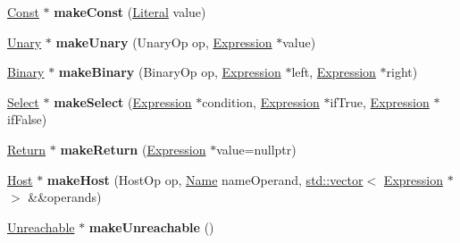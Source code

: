 \begin{DoxyCompactItemize}
\item 
\mbox{\label{classwasm_1_1_builder_a622973d92fa43fc978cd154b53f31558}} 
\mbox{\hyperlink{classwasm_1_1_const}{Const}} $\ast$ {\bfseries make\+Const} (\mbox{\hyperlink{classwasm_1_1_literal}{Literal}} value)
\item 
\mbox{\label{classwasm_1_1_builder_a750ec80e711cc4cf3f63f9b2875e8b5f}} 
\mbox{\hyperlink{classwasm_1_1_unary}{Unary}} $\ast$ {\bfseries make\+Unary} (Unary\+Op op, \mbox{\hyperlink{classwasm_1_1_expression}{Expression}} $\ast$value)
\item 
\mbox{\label{classwasm_1_1_builder_a1a2517d804590be409fb19d369f01470}} 
\mbox{\hyperlink{classwasm_1_1_binary}{Binary}} $\ast$ {\bfseries make\+Binary} (Binary\+Op op, \mbox{\hyperlink{classwasm_1_1_expression}{Expression}} $\ast$left, \mbox{\hyperlink{classwasm_1_1_expression}{Expression}} $\ast$right)
\item 
\mbox{\label{classwasm_1_1_builder_a7165aab76a4907b4fed23ba4ddecc1a2}} 
\mbox{\hyperlink{classwasm_1_1_select}{Select}} $\ast$ {\bfseries make\+Select} (\mbox{\hyperlink{classwasm_1_1_expression}{Expression}} $\ast$condition, \mbox{\hyperlink{classwasm_1_1_expression}{Expression}} $\ast$if\+True, \mbox{\hyperlink{classwasm_1_1_expression}{Expression}} $\ast$if\+False)
\item 
\mbox{\label{classwasm_1_1_builder_ac5987ec1b7b3a36e68928822e864d346}} 
\mbox{\hyperlink{classwasm_1_1_return}{Return}} $\ast$ {\bfseries make\+Return} (\mbox{\hyperlink{classwasm_1_1_expression}{Expression}} $\ast$value=nullptr)
\item 
\mbox{\label{classwasm_1_1_builder_a47ab33b30e62e59ae203fb6dfd708f4f}} 
\mbox{\hyperlink{classwasm_1_1_host}{Host}} $\ast$ {\bfseries make\+Host} (Host\+Op op, \mbox{\hyperlink{structwasm_1_1_name}{Name}} name\+Operand, \mbox{\hyperlink{classstd_1_1vector}{std\+::vector}}$<$ \mbox{\hyperlink{classwasm_1_1_expression}{Expression}} $\ast$$>$ \&\&operands)
\item 
\mbox{\label{classwasm_1_1_builder_a8ca8b435bc5842ed5abea3fd90507a2e}} 
\mbox{\hyperlink{classwasm_1_1_unreachable}{Unreachable}} $\ast$ {\bfseries make\+Unreachable} ()
$$
\end{DoxyCompactItemize}
